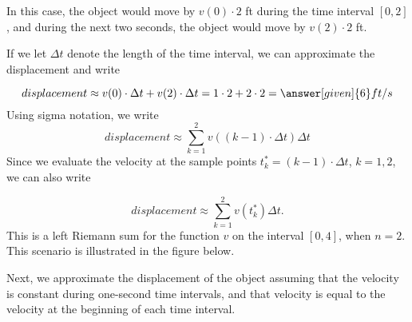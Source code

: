 \documentclass{ximera}
\begin{document}
\begin{example}
\begin{explanation}
In this case,  the object would move by $v(0)\cdot2$ ft during the time interval $[0,2]$, and during the next two seconds, the object would move by $v(2)\cdot2$ ft.
 
  
If we let $\Delta t$ denote the length of the time interval, we can approximate the displacement  and write

  \[
   displacement\approx v(0)\cdot\Delta t+v(2)\cdot\Delta t=1\cdot2+2\cdot2=\answer[given]{6} ft/s
  \]
Using sigma notation, we write
\[
   displacement\approx \sum_{k=1}^2v((k-1)\cdot\Delta t)\Delta t
  \]
Since we evaluate the velocity at the sample points $t_{k}^*=(k-1)\cdot\Delta t$, $k=1,2$, we can also  write

\[
   displacement\approx \sum_{k=1}^2v(t_{k}^*)\Delta t.
  \]
  This is a left Riemann sum for the function $v$ on the interval $[0,4]$, when $n=2$.
This scenario is illustrated in the figure below.
\begin{image}
\end{image}
Next, we approximate the displacement of the object assuming that the velocity is constant during one-second time intervals, and that velocity is equal to the velocity at the beginning of each time interval.



\end{explanation}
\end{example}
\end{document}
